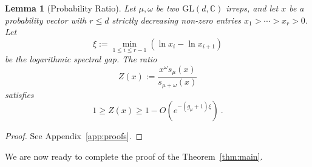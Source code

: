 \documentclass[a4paper,onecolumn,11pt]{quantumarticle}
\newtheorem{lem}{Lemma}
\begin{document}
\begin{lem}[Probability Ratio]\label{lem:ratio}
    Let \(\mu,\omega\) be two \(\mathrm{GL}(d,\mathbb C)\) irreps, and let \(x\) be a probability vector with \(r \le d\) strictly decreasing non-zero entries \(x_1>\cdots>x_r>0\). Let
    \[
    \xi := \min_{1 \le i \le r-1} (\ln x_i - \ln x_{i+1})
    \]
    be the logarithmic spectral gap. The ratio
    \begin{equation}
    Z(x):= \frac{x^\omega s_\mu(x)}{s_{\mu+\omega}(x)}
    \end{equation}
    satisfies
    \[
        1 \ge Z(x) \ge 1 - O\left(e^{-(g_\mu+1)\xi}\right)\ .
    \]
\end{lem}
\begin{proof}
    See Appendix~\ref{app:proofs}.
\end{proof}

We are now ready to complete the proof of the Theorem~\ref{thm:main}.
\end{document}
